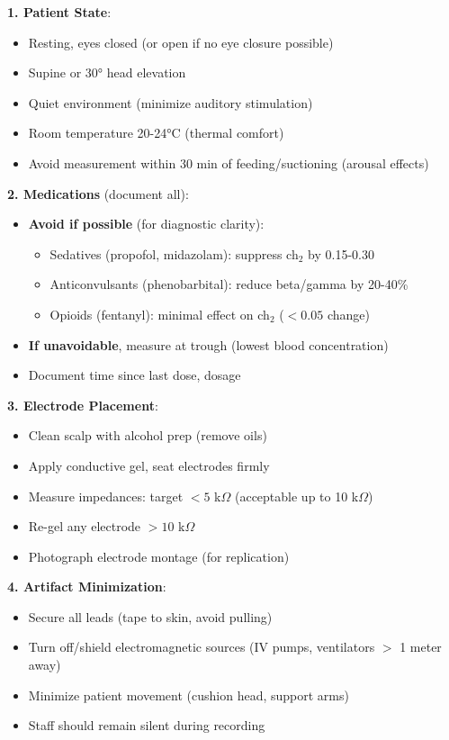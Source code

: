 \begin{protocol}\label{prot:prep}
\textbf{1. Patient State}:
\begin{itemize}
\item Resting, eyes closed (or open if no eye closure possible)
\item Supine or 30° head elevation
\item Quiet environment (minimize auditory stimulation)
\item Room temperature 20-24°C (thermal comfort)
\item Avoid measurement within 30 min of feeding/suctioning (arousal effects)
\end{itemize}

\textbf{2. Medications} (document all):
\begin{itemize}
\item \textbf{Avoid if possible} (for diagnostic clarity):
  \begin{itemize}
  \item Sedatives (propofol, midazolam): suppress ch$_2$ by 0.15-0.30
  \item Anticonvulsants (phenobarbital): reduce beta/gamma by 20-40\%
  \item Opioids (fentanyl): minimal effect on ch$_2$ ($< 0.05$ change)
  \end{itemize}
\item \textbf{If unavoidable}, measure at trough (lowest blood concentration)
\item Document time since last dose, dosage
\end{itemize}

\textbf{3. Electrode Placement}:
\begin{itemize}
\item Clean scalp with alcohol prep (remove oils)
\item Apply conductive gel, seat electrodes firmly
\item Measure impedances: target $< 5$ k$\Omega$ (acceptable up to 10 k$\Omega$)
\item Re-gel any electrode $> 10$ k$\Omega$
\item Photograph electrode montage (for replication)
\end{itemize}

\textbf{4. Artifact Minimization}:
\begin{itemize}
\item Secure all leads (tape to skin, avoid pulling)
\item Turn off/shield electromagnetic sources (IV pumps, ventilators $>$ 1 meter away)
\item Minimize patient movement (cushion head, support arms)
\item Staff should remain silent during recording
\end{itemize}
\end{protocol}

